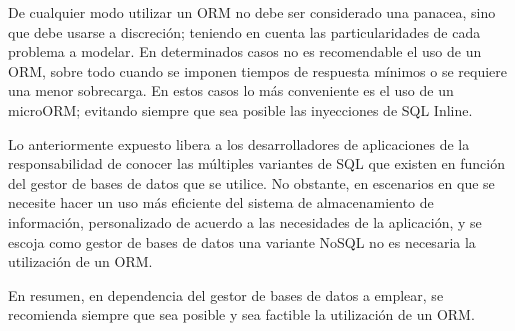 \documentclass[preprint,12pt]{elsarticle}
\begin{document}
De cualquier modo utilizar un ORM no debe ser considerado una panacea, sino que debe usarse a discreción; teniendo en cuenta las particularidades de cada problema a modelar. En determinados casos no es recomendable el uso de un ORM, sobre todo cuando se imponen tiempos de respuesta mínimos o se requiere una menor sobrecarga. En estos casos lo más conveniente es el uso de un microORM;
evitando siempre que sea posible las inyecciones de SQL Inline.

Lo anteriormente expuesto libera a los desarrolladores de aplicaciones de la responsabilidad de conocer las múltiples variantes de SQL que existen en función del gestor de bases de datos que se utilice. No obstante, en escenarios en que se necesite hacer un uso más eficiente del sistema de almacenamiento de información, personalizado de acuerdo a las necesidades de la aplicación, y se escoja como gestor de bases de datos una variante NoSQL no es necesaria la utilización de un ORM.

En resumen, en dependencia del gestor de bases de datos a emplear, se recomienda siempre que sea posible y sea factible la utilización de un ORM.	



	
	

	
	\newpage
	
		 

    

	
\end{document}

